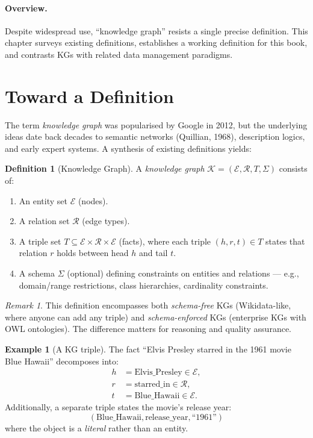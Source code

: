 \documentclass[11pt,a4paper,oneside,openany]{book}
\theoremstyle{definition}
\newtheorem{definition}{Definition}[chapter]
\newtheorem{example}{Example}[chapter]
\theoremstyle{plain}
\theoremstyle{remark}
\newtheorem{remark}{Remark}[chapter]
\newcommand{\cE}{\mathcal{E}}
\newcommand{\cR}{\mathcal{R}}
\newcommand{\kg}{\mathcal{K}}
\begin{document}
\paragraph{Overview.}
Despite widespread use, ``knowledge graph'' resists a single precise definition. This chapter surveys existing definitions, establishes a working definition for this book, and contrasts KGs with related data management paradigms.

\section{Toward a Definition}\label{sec:kg-def}

The term \emph{knowledge graph} was popularised by Google in 2012, but the underlying ideas date back decades to semantic networks (Quillian, 1968), description logics, and early expert systems. A synthesis of existing definitions yields:

\begin{definition}[Knowledge Graph]
	A \emph{knowledge graph} $\kg = (\cE, \cR, T, \Sigma)$ consists of:
	\begin{enumerate}
		\item An entity set $\cE$ (nodes).
		\item A relation set $\cR$ (edge types).
		\item A triple set $T \subseteq \cE \times \cR \times \cE$ (facts), where each triple $(h, r, t) \in T$ states that relation $r$ holds between head $h$ and tail $t$.
		\item A schema $\Sigma$ (optional) defining constraints on entities and relations --- e.g., domain/range restrictions, class hierarchies, cardinality constraints.
	\end{enumerate}
\end{definition}

\begin{remark}
	This definition encompasses both \emph{schema-free} KGs (Wikidata-like, where anyone can add any triple) and \emph{schema-enforced} KGs (enterprise KGs with OWL ontologies). The difference matters for reasoning and quality assurance.
\end{remark}

\begin{example}[A KG triple]
	\label{ex:triple}
	The fact ``Elvis Presley starred in the 1961 movie Blue Hawaii'' decomposes into:
	\begin{align*}
		h & = \text{Elvis\_Presley} \in \cE, \\
		r & = \text{starred\_in} \in \cR,    \\
		t & = \text{Blue\_Hawaii} \in \cE.
	\end{align*}
	Additionally, a separate triple states the movie's release year:
	$$(\text{Blue\_Hawaii}, \text{release\_year}, \text{``1961''})$$
	where the object is a \emph{literal} rather than an entity.
\end{example}
\end{document}
